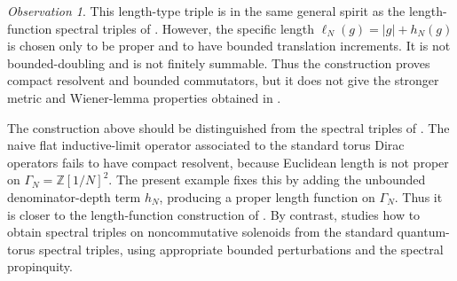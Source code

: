\documentclass[11pt]{amsart}
\theoremstyle{definition}
\theoremstyle{remark}
\newtheorem{observation}[theorem]{Observation}
\newcommand{\Z}{\mathbb{Z}}
\begin{document}
\begin{observation}
This length-type triple is in the same general spirit as the length-function
spectral triples of \cite{FarsiLandryLarsenPackerSolenoids}. However, the
specific length $\ell_N(g)=|g|+h_N(g)$ is chosen only to be proper and to have
bounded translation increments. It is not bounded-doubling and is not finitely
summable. Thus the construction proves compact resolvent and bounded
commutators, but it does not give the stronger metric and Wiener-lemma
properties obtained in \cite{FarsiLandryLarsenPackerSolenoids}.

The construction above should be distinguished from the spectral triples of
\cite{FarsiLatremolierePackerStandardSolenoids}. The naive flat inductive-limit
operator associated to the standard torus Dirac operators fails to have compact
resolvent, because Euclidean length is not proper on
$\Gamma_N=\Z[1/N]^2$. The present example fixes this by adding the unbounded
denominator-depth term $h_N$, producing a proper length function on
$\Gamma_N$. Thus it is closer to the length-function construction of
\cite{FarsiLandryLarsenPackerSolenoids}. By contrast,
\cite{FarsiLatremolierePackerStandardSolenoids} studies how to obtain spectral
triples on noncommutative solenoids from the standard quantum-torus spectral
triples, using appropriate bounded perturbations and the spectral propinquity.
\end{observation}
\end{document}
